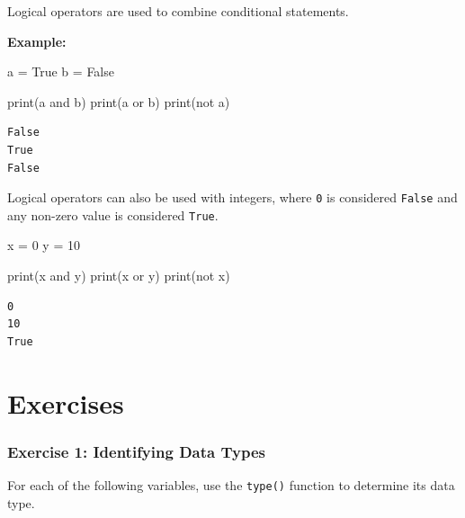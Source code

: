 \documentclass[
  letterpaper,
  DIV=11,
  numbers=noendperiod]{scrreprt}
\newenvironment{Shaded}{\begin{snugshade}}{\end{snugshade}}
\newcommand{\BuiltInTok}[1]{\textcolor[rgb]{0.00,0.23,0.31}{#1}}
\newcommand{\DecValTok}[1]{\textcolor[rgb]{0.68,0.00,0.00}{#1}}
\newcommand{\KeywordTok}[1]{\textcolor[rgb]{0.00,0.23,0.31}{#1}}
\newcommand{\NormalTok}[1]{\textcolor[rgb]{0.00,0.23,0.31}{#1}}
\newcommand{\OperatorTok}[1]{\textcolor[rgb]{0.37,0.37,0.37}{#1}}
\newcommand{\VariableTok}[1]{\textcolor[rgb]{0.07,0.07,0.07}{#1}}
\begin{document}
Logical operators are used to combine conditional statements.

\textbf{Example:}

\begin{Shaded}
\begin{Highlighting}[]
\NormalTok{a }\OperatorTok{=} \VariableTok{True}
\NormalTok{b }\OperatorTok{=} \VariableTok{False}

\BuiltInTok{print}\NormalTok{(a }\KeywordTok{and}\NormalTok{ b)  }
\BuiltInTok{print}\NormalTok{(a }\KeywordTok{or}\NormalTok{ b)  }
\BuiltInTok{print}\NormalTok{(}\KeywordTok{not}\NormalTok{ a)   }
\end{Highlighting}
\end{Shaded}

\begin{verbatim}
False
True
False
\end{verbatim}

Logical operators can also be used with integers, where \texttt{0} is
considered \texttt{False} and any non-zero value is considered
\texttt{True}.

\begin{Shaded}
\begin{Highlighting}[]
\NormalTok{x }\OperatorTok{=} \DecValTok{0}
\NormalTok{y }\OperatorTok{=} \DecValTok{10}

\BuiltInTok{print}\NormalTok{(x }\KeywordTok{and}\NormalTok{ y)  }
\BuiltInTok{print}\NormalTok{(x }\KeywordTok{or}\NormalTok{ y)   }
\BuiltInTok{print}\NormalTok{(}\KeywordTok{not}\NormalTok{ x)  }
\end{Highlighting}
\end{Shaded}

\begin{verbatim}
0
10
True
\end{verbatim}

\hypertarget{exercises-1}{%
\section{Exercises}\label{exercises-1}}

\hypertarget{exercise-1-identifying-data-types}{%
\subsubsection{Exercise 1: Identifying Data
Types}\label{exercise-1-identifying-data-types}}

For each of the following variables, use the \texttt{type()} function to
determine its data type.
\end{document}
